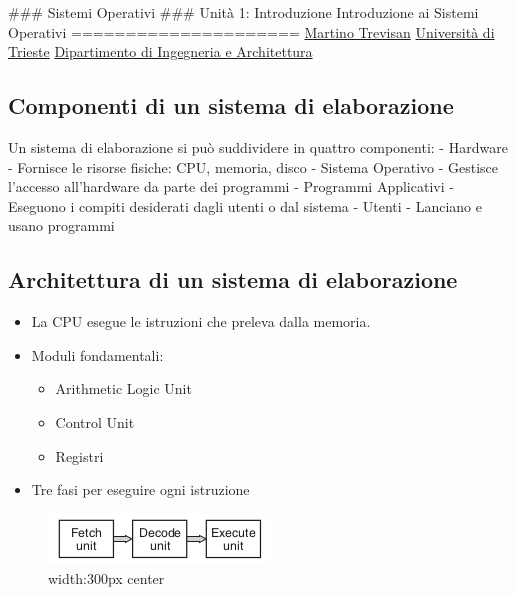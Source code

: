 \documentclass[]{article}
\date{}
\providecommand{\tightlist}{%
  \setlength{\itemsep}{0pt}\setlength{\parskip}{0pt}}
\begin{document}
\#\#\# Sistemi Operativi \#\#\# Unità 1: Introduzione Introduzione ai
Sistemi Operativi =====================
\href{https://trevisan.inginf.units.it/}{Martino Trevisan}
\href{https://www.units.it}{Università di Trieste}
\href{https://dia.units.it/}{Dipartimento di Ingegneria e Architettura}

\hypertarget{componenti-di-un-sistema-di-elaborazione}{%
\subsection{Componenti di un sistema di
elaborazione}\label{componenti-di-un-sistema-di-elaborazione}}

Un sistema di elaborazione si può suddividere in quattro componenti: -
Hardware - Fornisce le risorse fisiche: CPU, memoria, disco - Sistema
Operativo - Gestisce l'accesso all'hardware da parte dei programmi -
Programmi Applicativi - Eseguono i compiti desiderati dagli utenti o dal
sistema - Utenti - Lanciano e usano programmi

\hypertarget{architettura-di-un-sistema-di-elaborazione}{%
\subsection{Architettura di un sistema di
elaborazione}\label{architettura-di-un-sistema-di-elaborazione}}

\begin{itemize}
\tightlist
\item
  La CPU esegue le istruzioni che preleva dalla memoria.
\item
  Moduli fondamentali:

  \begin{itemize}
  \tightlist
  \item
    Arithmetic Logic Unit
  \item
    Control Unit
  \item
    Registri
  \end{itemize}
\item
  Tre fasi per eseguire ogni istruzione
\end{itemize}

\begin{figure}
\centering
\includegraphics{images/cpu.png}
\caption{width:300px center}
\end{figure}
\end{document}
